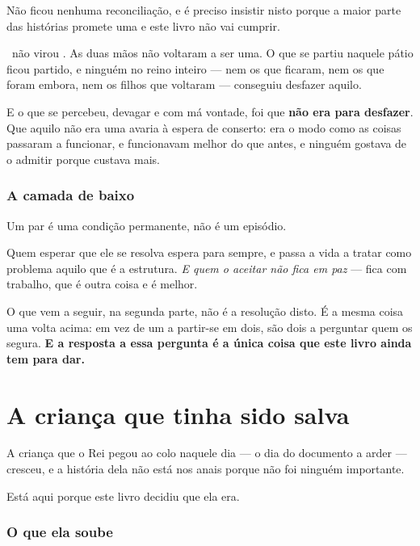 \documentclass[livro.tex]{subfiles}
\begin{document}
Não ficou nenhuma reconciliação, e é preciso insistir nisto porque a maior parte das histórias
promete uma e este livro não vai cumprir.

\medskip

\Drk\ não virou \Ben. As duas mãos não voltaram a ser uma. O que se partiu naquele pátio ficou
partido, e ninguém no reino inteiro --- nem os que ficaram, nem os que foram embora, nem os
filhos que voltaram --- conseguiu desfazer aquilo.

\medskip

E o que se percebeu, devagar e com má vontade, foi que \textbf{não era para desfazer}. Que aquilo
não era uma avaria à espera de conserto: era o modo como as coisas passaram a funcionar, e
funcionavam melhor do que antes, e ninguém gostava de o admitir porque custava mais.

\subsection*{A camada de baixo}

Um par é uma condição permanente, não é um episódio.

\medskip

Quem esperar que ele se resolva espera para sempre, e passa a vida a tratar como problema aquilo
que é a estrutura. \emph{E quem o aceitar não fica em paz} --- fica com trabalho, que é outra
coisa e é melhor.

\medskip

O que vem a seguir, na segunda parte, não é a resolução disto. É a mesma coisa uma volta acima: em
vez de um a partir-se em dois, são dois a perguntar quem os segura. \textbf{E a resposta a essa
pergunta é a única coisa que este livro ainda tem para dar.}


\chapter{A criança que tinha sido salva}

A criança que o Rei pegou ao colo naquele dia --- o dia do documento a arder --- cresceu, e a
história dela não está nos anais porque não foi ninguém importante.

\medskip

Está aqui porque este livro decidiu que ela era.

\subsection*{O que ela soube}
\end{document}
